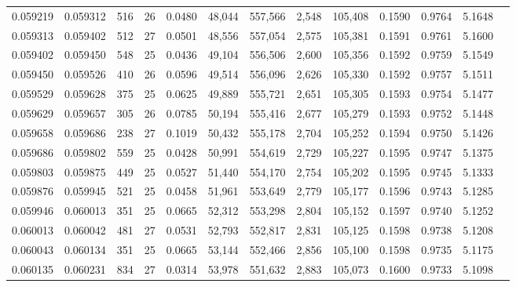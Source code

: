 \begin{tabular}{rrrrrrrrrrrrr}
0.059219 & 0.059312 & 516 &  26 &                                     0.0480 &  48,044 & 557,566 &   2,548 & 105,408 & 0.1590 & 0.9764 & 5.1648 \\
0.059313 & 0.059402 & 512 &  27 &                                     0.0501 &  48,556 & 557,054 &   2,575 & 105,381 & 0.1591 & 0.9761 & 5.1600 \\
0.059402 & 0.059450 & 548 &  25 &                                     0.0436 &  49,104 & 556,506 &   2,600 & 105,356 & 0.1592 & 0.9759 & 5.1549 \\
0.059450 & 0.059526 & 410 &  26 &                                     0.0596 &  49,514 & 556,096 &   2,626 & 105,330 & 0.1592 & 0.9757 & 5.1511 \\
0.059529 & 0.059628 & 375 &  25 &                                     0.0625 &  49,889 & 555,721 &   2,651 & 105,305 & 0.1593 & 0.9754 & 5.1477 \\
0.059629 & 0.059657 & 305 &  26 &                                     0.0785 &  50,194 & 555,416 &   2,677 & 105,279 & 0.1593 & 0.9752 & 5.1448 \\
0.059658 & 0.059686 & 238 &  27 &                                     0.1019 &  50,432 & 555,178 &   2,704 & 105,252 & 0.1594 & 0.9750 & 5.1426 \\
0.059686 & 0.059802 & 559 &  25 &                                     0.0428 &  50,991 & 554,619 &   2,729 & 105,227 & 0.1595 & 0.9747 & 5.1375 \\
0.059803 & 0.059875 & 449 &  25 &                                     0.0527 &  51,440 & 554,170 &   2,754 & 105,202 & 0.1595 & 0.9745 & 5.1333 \\
0.059876 & 0.059945 & 521 &  25 &                                     0.0458 &  51,961 & 553,649 &   2,779 & 105,177 & 0.1596 & 0.9743 & 5.1285 \\
0.059946 & 0.060013 & 351 &  25 &                                     0.0665 &  52,312 & 553,298 &   2,804 & 105,152 & 0.1597 & 0.9740 & 5.1252 \\
0.060013 & 0.060042 & 481 &  27 &                                     0.0531 &  52,793 & 552,817 &   2,831 & 105,125 & 0.1598 & 0.9738 & 5.1208 \\
0.060043 & 0.060134 & 351 &  25 &                                     0.0665 &  53,144 & 552,466 &   2,856 & 105,100 & 0.1598 & 0.9735 & 5.1175 \\
0.060135 & 0.060231 & 834 &  27 &                                     0.0314 &  53,978 & 551,632 &   2,883 & 105,073 & 0.1600 & 0.9733 & 5.1098 \\

\end{tabular}
